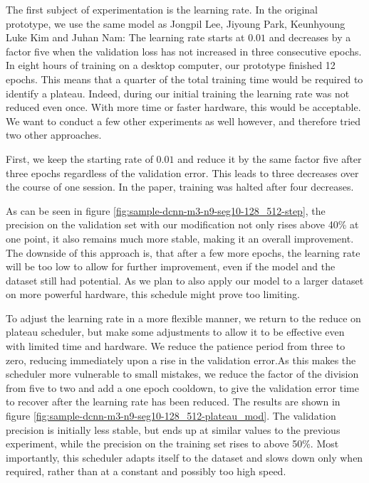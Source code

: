 The first subject of experimentation is the learning rate. In the original prototype, we use the same model as Jongpil Lee, Jiyoung Park, Keunhyoung Luke Kim and Juhan Nam: The learning rate starts at $0.01$ and decreases by a factor five when the validation loss has not increased in three consecutive epochs. In eight hours of training on a desktop computer, our prototype finished 12 epochs. This means that a quarter of the total training time would be required to identify a plateau. Indeed, during our initial training the learning rate was not reduced even once. With more time or faster hardware, this would be acceptable. We want to conduct a few other experiments as well however, and therefore tried two other approaches.

First, we keep the starting rate of $0.01$ and reduce it by the same factor five after three epochs regardless of the validation error. This leads to three decreases over the course of one session. In the paper, training was halted after four decreases.

As can be seen in figure \ref{fig:sample-dcnn-m3-n9-seg10-128_512-step}, the precision on the validation set with our modification not only rises above 40\% at one point, it also remains much more stable, making it an overall improvement. The downside of this approach is, that after a few more epochs, the learning rate will be too low to allow for further improvement, even if the model and the dataset still had potential. As we plan to also apply our model to a larger dataset on more powerful hardware, this schedule might prove too limiting.

To adjust the learning rate in a more flexible manner, we return to the reduce on plateau scheduler, but make some adjustments to allow it to be effective even with limited time and hardware. We reduce the patience period from three to zero, reducing immediately upon a rise in the validation error.As this makes the scheduler more vulnerable to small mistakes, we reduce the factor of the division from five to two and add a one epoch cooldown, to give the validation error time to recover after the learning rate has been reduced. The results are shown in figure \ref{fig:sample-dcnn-m3-n9-seg10-128_512-plateau_mod}. The validation precision is initially less stable, but ends up at similar values to the previous experiment, while the precision on the training set rises to above 50\%. Most importantly, this scheduler adapts itself to the dataset and slows down only when required, rather than at a constant and possibly too high speed.

